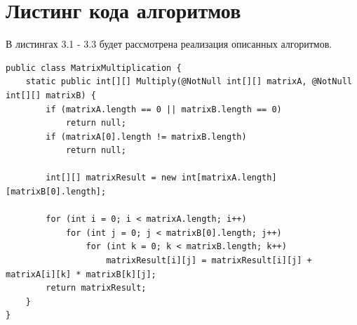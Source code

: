 \documentclass[12pt]{report}
\begin{document}
\section{Листинг кода алгоритмов}
В листингах 3.1 - 3.3 будет рассмотрена реализация описанных алгоритмов.

\begin{lstlisting}[label=CodeStand,caption= Стандартный алгоритм умножения матриц]
public class MatrixMultiplication {
    static public int[][] Multiply(@NotNull int[][] matrixA, @NotNull int[][] matrixB) {
        if (matrixA.length == 0 || matrixB.length == 0)
            return null;
        if (matrixA[0].length != matrixB.length)
            return null;

        int[][] matrixResult = new int[matrixA.length][matrixB[0].length];

        for (int i = 0; i < matrixA.length; i++)
            for (int j = 0; j < matrixB[0].length; j++)
                for (int k = 0; k < matrixB.length; k++)
                    matrixResult[i][j] = matrixResult[i][j] + matrixA[i][k] * matrixB[k][j];
        return matrixResult;
    }
}
\end{lstlisting}
\end{document}
